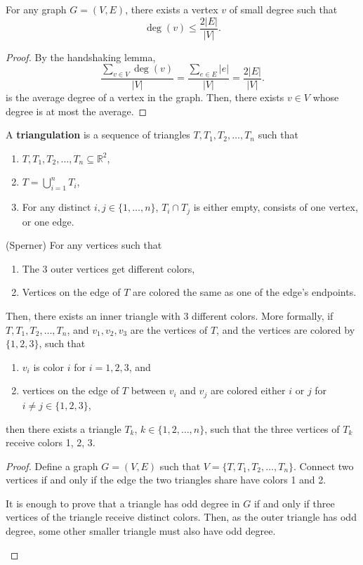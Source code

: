 
\begin{lemma}
	For any graph \( G = (V,E) \), there exists a vertex \( v \) of small degree such that \[
		\deg(v) \le \frac{2|E|}{|V|}
	.\] 
\end{lemma}
\begin{proof}
	By the handshaking lemma, \[
		\frac{\sum_{v \in V} \deg(v)}{|V|} = \frac{\sum_{e \in E}|e|}{|V|} = \frac{2|E|}{|V|}
	.\] is the average degree of a vertex in the graph. Then, there exists \( v \in V \) whose degree is at most the average.
\end{proof} 

\begin{definition}
	A \textbf{triangulation} is a sequence of triangles \( T, T_{1}, T_{2}, \ldots , T_n \) such that 
	\begin{enumerate}
		\item \( T, T_{1}, T_{2}, \ldots , T_n \subseteq  \mathbb{R}^{2}  \),
		\item \( T = \bigcup_{i=1}^{n}T_i   \),
		\item For any distinct \( i,j \in \{1, \ldots , n\}   \), \( T_i \cap T_j \) is either empty, consists of one vertex, or one edge.
	\end{enumerate}
\end{definition}

\begin{lemma}
	(Sperner) For any vertices such that 
	\begin{enumerate}
		\item The 3 outer vertices get different colors,
		\item Vertices on the edge of \( T \) are colored the same as one of the edge's endpoints.
	\end{enumerate}
	Then, there exists an inner triangle with 3 different colors. More formally, if \( T, T_{1}, T_{2}, \ldots , T_n \), and \( v_{1},v_{2},v_{3} \) are the vertices of \( T \), and the vertices are colored by \( \{1, 2, 3\}   \), such that
	\begin{enumerate}
		\item \( v_i \) is color \( i \) for \( i=1, 2, 3 \), and 
		\item vertices on the edge of \( T \) between \( v_i \) and \( v_j \) are colored either \( i \) or \( j \) for \( i\neq j \in \{1, 2, 3\}  \),
	\end{enumerate}
	then there exists a triangle \( T_k \), \( k \in \{1,2,\ldots ,n\}   \), such that the three vertices of \( T_k \) receive colors 1, 2, 3.
\end{lemma}
\begin{proof}
	Define a graph \( G=(V,E) \) such that \( V = \{T, T_{1}, T_{2}, \ldots ,T_n\}   \). Connect two vertices if and only if the edge the two triangles share have colors 1 and 2. 
	\begin{observation}
		It is enough to prove that a triangle has odd degree in \( G \) if and only if three vertices of the triangle receive distinct colors. Then, as the outer triangle has odd degree, some other smaller triangle must also have odd degree.
	\end{observation}
\end{proof}

